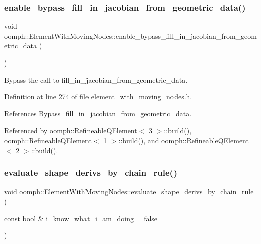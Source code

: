 \subsubsection{\texorpdfstring{enable\+\_\+bypass\+\_\+fill\+\_\+in\+\_\+jacobian\+\_\+from\+\_\+geometric\+\_\+data()}{enable\_bypass\_fill\_in\_jacobian\_from\_geometric\_data()}}
{\footnotesize\ttfamily void oomph\+::\+Element\+With\+Moving\+Nodes\+::enable\+\_\+bypass\+\_\+fill\+\_\+in\+\_\+jacobian\+\_\+from\+\_\+geometric\+\_\+data (\begin{DoxyParamCaption}{ }\end{DoxyParamCaption})\hspace{0.3cm}{\ttfamily [inline]}}



Bypass the call to fill\+\_\+in\+\_\+jacobian\+\_\+from\+\_\+geometric\+\_\+data. 



Definition at line 274 of file element\+\_\+with\+\_\+moving\+\_\+nodes.\+h.



References Bypass\+\_\+fill\+\_\+in\+\_\+jacobian\+\_\+from\+\_\+geometric\+\_\+data.



Referenced by oomph\+::\+Refineable\+Q\+Element$<$ 3 $>$\+::build(), oomph\+::\+Refineable\+Q\+Element$<$ 1 $>$\+::build(), and oomph\+::\+Refineable\+Q\+Element$<$ 2 $>$\+::build().

\mbox{\label{classoomph_1_1ElementWithMovingNodes_aba14c845323dc4ef435afd18314ede70}} 
\subsubsection{\texorpdfstring{evaluate\+\_\+shape\+\_\+derivs\+\_\+by\+\_\+chain\+\_\+rule()}{evaluate\_shape\_derivs\_by\_chain\_rule()}}
{\footnotesize\ttfamily void oomph\+::\+Element\+With\+Moving\+Nodes\+::evaluate\+\_\+shape\+\_\+derivs\+\_\+by\+\_\+chain\+\_\+rule (\begin{DoxyParamCaption}\item[{const bool \&}]{i\+\_\+know\+\_\+what\+\_\+i\+\_\+am\+\_\+doing = {\ttfamily false} }\end{DoxyParamCaption})\hspace{0.3cm}{\ttfamily [inline]}}



